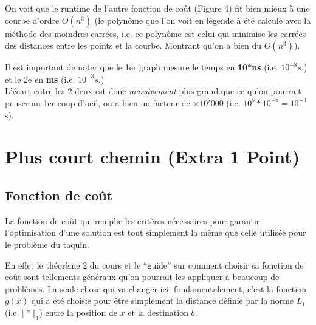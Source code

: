 \documentclass[french]{article}
\newcommand{\quo}[1]{``{#1}''}
\begin{document}
\begin{enumerate}
On voit que le runtime de l'autre fonction de coût (Figure 4) fit bien mieux à une courbe d'ordre $O(n^3)$ 
(le polynôme que l'on voit en légende à été calculé avec la méthode des moindres carrées, i.e. ce polynôme est celui qui minimise les carrées des distances entre les points et la courbe.
Montrant qu'on a bien du $O(n^3)$).

Il est important de noter que le 1er graph mesure le temps en \textbf{10$*$ns} (i.e. \( 10^{-8} s\).) et le 2e en \textbf{ms} (i.e. \( 10^{-3} s\).)\\
L'écart entre les 2 deux est donc \textit{massivement} plus grand que ce qu'on pourrait penser au 1er coup d'oeil, on a bien un facteur de $\times 10'000$ (i.e. \( 10^5 * 10^{-8} = 10^{-3}\ \)s).
\end{enumerate}


\section{Plus court chemin (Extra 1 Point)}

\subsection{Fonction de coût}

La fonction de coût qui remplie les critères nécessaires pour garantir l'optimisation d'une solution est
tout simplement la même que celle utilisée pour le problème du taquin.

En effet le théorème 2 du cours et le \quo{guide} sur comment choisir sa fonction de coût sont
tellements généraux qu'on pourrait les appliquer à beaucoup de problèmes.
La seule chose qui va changer ici, fondamentalement, c'est la fonction $g(x)$ qui a été choisie pour être simplement 
la distance définie par la norme $L_1$ (i.e. \(\Vert * \Vert_1\)) 
entre la position de $x$ et la destination $b$.

%
%
\end{document}
